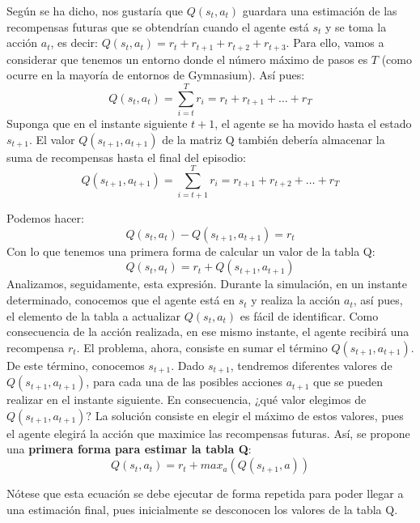 \documentclass{article}
\begin{document}
Según se ha dicho, nos gustaría que $Q(s_t,a_t)$ guardara una estimación de las recompensas futuras que se obtendrían cuando el agente está $s_t$ y se toma la acción $a_t$, es decir:
$Q(s_t,a_t)=r_t + r_{t+1} + r_{t+2} + r_{t+3}$. Para ello, vamos a considerar que tenemos un entorno donde el número máximo de pasos es $T$ (como ocurre en la mayoría de entornos de Gymnasium). Así pues:
\begin{equation}\label{eq:estandar_sum_of_rewards}
Q(s_t,a_t) = \sum_{i=t}^{T} r_i= r_t +  r_{t+1}+ \ldots + r_T
\end{equation}
Suponga que en el instante siguiente $t+1$, el agente se ha movido hasta el estado $s_{t+1}$. El valor $Q(s_{t+1},a_{t+1})$ de la matriz Q también debería almacenar la suma de recompensas hasta el final del episodio:
\begin{equation}
Q(s_{t+1},a_{t+1}) = \sum_{i=t+1}^{T} r_i = r_{t+1} +r_{t+2} + \ldots + r_T     
\end{equation}

Podemos hacer: 
\begin{equation}
    Q(s_t,a_t) - Q(s_{t+1},a_{t+1}) = r_t
\end{equation}
Con lo que tenemos una primera forma de calcular un valor de la tabla Q:
\begin{equation*}
Q(s_t,a_t) = r_t + Q(s_{t+1},a_{t+1})   
\end{equation*}
Analizamos, seguidamente, esta expresión. Durante la simulación, en un instante determinado, conocemos que el agente está en $s_t$ y realiza la acción $a_t$, así pues, el elemento de la tabla a actualizar $Q(s_t , a_t)$ es fácil de identificar. Como consecuencia de la acción realizada, en ese mismo instante, el agente recibirá una recompensa $r_t$. El problema, ahora, consiste en sumar el término $Q(s_{t+1},a_{t+1})$. De este término, conocemos $s_{t+1}$. Dado $s_{t+1}$, tendremos diferentes valores de $Q(s_{t+1}, a_{t+1})$, para cada una de las posibles acciones $a_{t+1}$ que se pueden realizar en el instante siguiente. En consecuencia, ¿qué valor elegimos de $Q(s_{t+1},a_{t+1})$? La solución consiste en elegir el máximo de estos valores, pues el agente elegirá la acción que maximice las recompensas futuras. Así, se propone una \textbf{primera forma para estimar la tabla Q}:
\begin{equation*}
Q(s_t,a_t) = r_t + max_a(Q(s_{t+1},a))
\end{equation*}

Nótese que esta ecuación se debe ejecutar de forma repetida para poder llegar a una estimación final, pues inicialmente se desconocen los valores de la tabla Q. 
\end{document}
